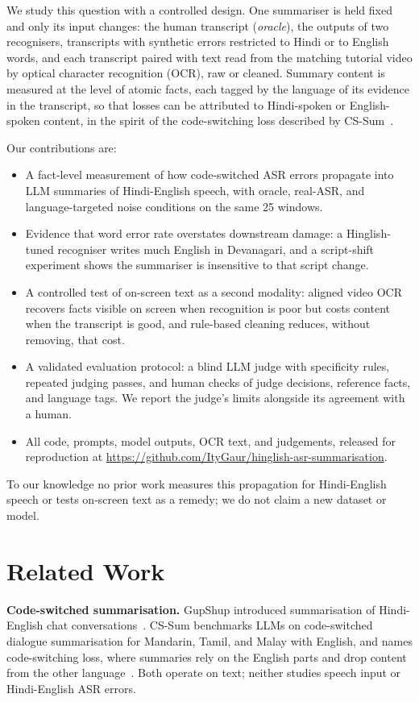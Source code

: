 \documentclass[conference]{IEEEtran}
\begin{document}
We study this question with a controlled design. One summariser is held fixed and only its input changes: the human transcript (\emph{oracle}), the outputs of two recognisers, transcripts with synthetic errors restricted to Hindi or to English words, and each transcript paired with text read from the matching tutorial video by optical character recognition (OCR), raw or cleaned. Summary content is measured at the level of atomic facts, each tagged by the language of its evidence in the transcript, so that losses can be attributed to Hindi-spoken or English-spoken content, in the spirit of the code-switching loss described by CS-Sum~\cite{suresh2025cssum}.

Our contributions are:
\begin{itemize}
\item A fact-level measurement of how code-switched ASR errors propagate into LLM summaries of Hindi-English speech, with oracle, real-ASR, and language-targeted noise conditions on the same 25 windows.
\item Evidence that word error rate overstates downstream damage: a Hinglish-tuned recogniser writes much English in Devanagari, and a script-shift experiment shows the summariser is insensitive to that script change.
\item A controlled test of on-screen text as a second modality: aligned video OCR recovers facts visible on screen when recognition is poor but costs content when the transcript is good, and rule-based cleaning reduces, without removing, that cost.
\item A validated evaluation protocol: a blind LLM judge with specificity rules, repeated judging passes, and human checks of judge decisions, reference facts, and language tags. We report the judge's limits alongside its agreement with a human.
\item All code, prompts, model outputs, OCR text, and judgements, released for reproduction at \url{https://github.com/ItyGaur/hinglish-asr-summarisation}.
\end{itemize}

To our knowledge no prior work measures this propagation for Hindi-English speech or tests on-screen text as a remedy; we do not claim a new dataset or model.

\section{Related Work}
\textbf{Code-switched summarisation.} GupShup introduced summarisation of Hindi-English chat conversations~\cite{mehnaz2021gupshup}. CS-Sum benchmarks LLMs on code-switched dialogue summarisation for Mandarin, Tamil, and Malay with English, and names code-switching loss, where summaries rely on the English parts and drop content from the other language~\cite{suresh2025cssum}. Both operate on text; neither studies speech input or Hindi-English ASR errors.
\end{document}
